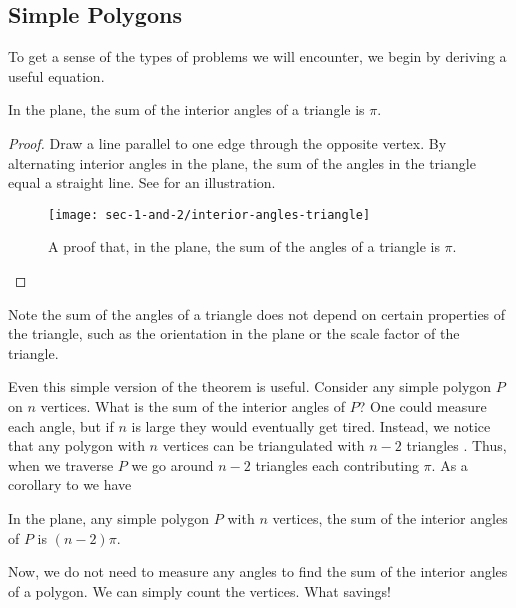\subsection{Simple Polygons}
\label{sec:warm-up}

To get a sense of the types of problems we will encounter,
we begin by deriving a useful equation.
\begin{theorem}\label{thm:triangle}
In the plane, the sum of the interior angles of a triangle is $\pi$.
\end{theorem}
\begin{proof}
Draw a line parallel to one edge through the opposite vertex.
By alternating interior angles in the plane, the sum of the angles
in the triangle equal  a straight line.
See  for an illustration. 



\begin{figure}[htb]
\centering
\texttt{[image: sec-1-and-2/interior-angles-triangle]}
\caption{A proof that, in the plane, the sum of the angles of a triangle is $\pi$.}
\label{fig:angles}
\end{figure}

\end{proof}

Note the sum of the angles of a triangle does not
depend on certain properties of the  triangle, such as the orientation in the plane or
the scale factor of the triangle.


Even this simple version of the theorem is useful.
Consider any simple polygon $P$ on $n$ vertices. 
What is the sum of the interior angles of $P$?
One could measure each angle, but if $n$ is large they would eventually
get tired.
Instead, we notice that any polygon with $n$ vertices can be
triangulated with $n-2$ triangles \cite{orourke_computational_1994}.
Thus, when we traverse $P$ we go around $n-2$ triangles each contributing
$\pi$.
As a corollary to  we have
\begin{corollary}\label{cor:angles}
In the plane, any simple polygon $P$ with $n$ vertices,
the sum of the interior angles of $P$ is $(n-2)\pi$.

\end{corollary}

Now, we do not need to measure any angles to find
the sum of  the interior angles of a polygon. We can simply
count the vertices. What savings!
